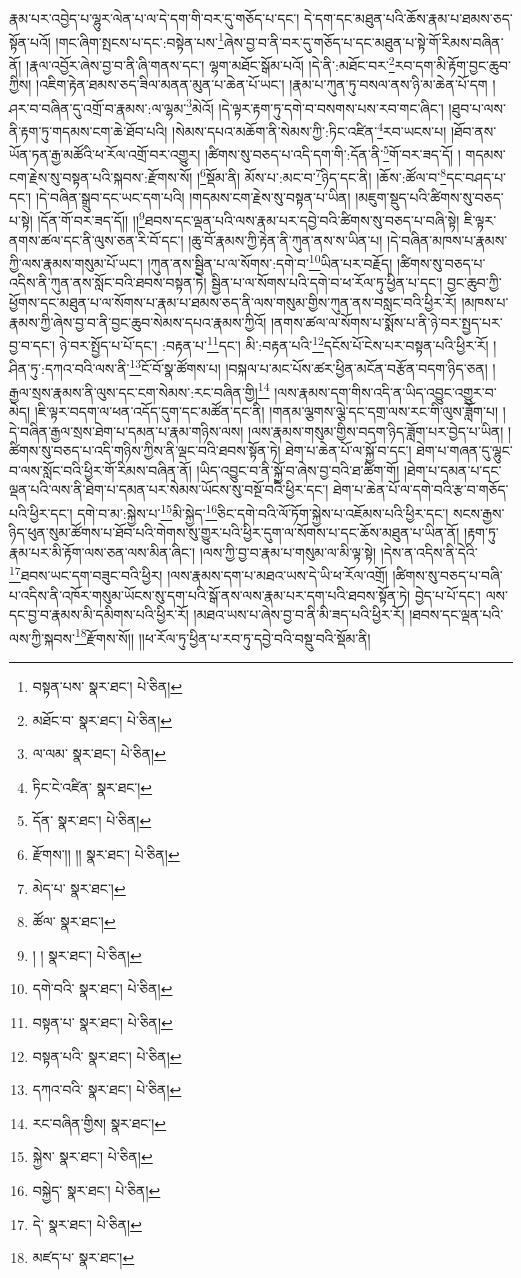 རྣམ་པར་འབྱེད་པ་ལྷུར་ལེན་པ་ལ་དེ་དག་གི་བར་དུ་གཅོད་པ་དང་། དེ་དག་དང་མཐུན་པའི་ཆོས་རྣམ་པ་ཐམས་ཅད་སྟོན་པའོ། །གང་ཞིག་སྤངས་པ་དང་:བསྟེན་པས་\footnote{བསྟན་པས་  སྣར་ཐང་།  པེ་ཅིན། }ཞེས་བྱ་བ་ནི་བར་དུ་གཅོད་པ་དང་མཐུན་པ་སྟེ་གོ་རིམས་བཞིན་ནོ། །རྣལ་འབྱོར་ཞེས་བྱ་བ་ནི་ཞི་གནས་དང་། ལྷག་མཐོང་སྒོམ་པའོ། །དེ་ནི་:མཐོང་བར་\footnote{མཐོང་བ་  སྣར་ཐང་།  པེ་ཅིན། }རབ་དག་མི་རྟོག་བྱང་ཆུབ་ཀྱིས། །འཇིག་རྟེན་ཐམས་ཅད་ཟིལ་མནན་མུན་པ་ཆེན་པོ་ཡང་། །རྣམ་པ་ཀུན་ཏུ་བསལ་ནས་ཉི་མ་ཆེན་པོ་དག །ཤར་བ་བཞིན་དུ་འགྲོ་བ་རྣམས་:ལ་ལྷམ་\footnote{ལ་ལམ་  སྣར་ཐང་།  པེ་ཅིན། }མེའོ། །དེ་ལྟར་རྟག་ཏུ་དགེ་བ་བསགས་པས་རབ་གང་ཞིང་། །ཐུབ་པ་ལས་ནི་རྟག་ཏུ་གདམས་ངག་ཆེ་ཐོབ་པའི། །སེམས་དཔའ་མཆོག་ནི་སེམས་ཀྱི་:ཏིང་འཛིན་\footnote{ཏིང་ངེ་འཛིན་  སྣར་ཐང་། }རབ་ཡངས་པ། །ཐོབ་ནས་ཡོན་ཏན་རྒྱ་མཚོའི་ཕ་རོལ་འགྲོ་བར་འགྱུར། །ཚིགས་སུ་བཅད་པ་འདི་དག་གི་:དོན་ནི་\footnote{དོན་  སྣར་ཐང་།  པེ་ཅིན། }གོ་བར་ཟད་དོ། །
གདམས་ངག་རྗེས་སུ་བསྟན་པའི་སྐབས་:རྫོགས་སོ། །\footnote{རྫོགས་།། །།  སྣར་ཐང་།  པེ་ཅིན། }སྡོམ་ནི། མོས་པ་:མང་བ་\footnote{མེད་པ་  སྣར་ཐང་། }ཉིད་དང་ནི། །ཆོས་:ཚོལ་བ་\footnote{ཚོལ་  སྣར་ཐང་། }དང་བཤད་པ་དང་། །དེ་བཞིན་སྒྲུབ་དང་ཡང་དག་པའི། །གདམས་ངག་རྗེས་སུ་བསྟན་པ་ཡིན། །མཇུག་སྡུད་པའི་ཚིགས་སུ་བཅད་པ་སྟེ། །དོན་གོ་བར་ཟད་དོ།། །།\footnote{། །  སྣར་ཐང་།  པེ་ཅིན། }ཐབས་དང་ལྡན་པའི་ལས་རྣམ་པར་དབྱེ་བའི་ཚིགས་སུ་བཅད་པ་བཞི་སྟེ། ཇི་ལྟར་ནགས་ཚལ་དང་ནི་ལུས་ཅན་རི་བོ་དང་། །ཆུ་བོ་རྣམས་ཀྱི་རྟེན་ནི་ཀུན་ནས་ས་ཡིན་པ། །དེ་བཞིན་མཁས་པ་རྣམས་ཀྱི་ལས་རྣམས་གསུམ་པོ་ཡང་། །ཀུན་ནས་སྦྱིན་པ་ལ་སོགས་:དགེ་བ་\footnote{དགེ་བའི་  སྣར་ཐང་།  པེ་ཅིན། }ཡིན་པར་བརྗོད། །ཚིགས་སུ་བཅད་པ་འདིས་ནི་ཀུན་ནས་སློང་བའི་ཐབས་བསྟན་ཏེ། སྦྱིན་པ་ལ་སོགས་པའི་དགེ་བ་ཕ་རོལ་ཏུ་ཕྱིན་པ་དང་། བྱང་ཆུབ་ཀྱི་ཕྱོགས་དང་མཐུན་པ་ལ་སོགས་པ་རྣམ་པ་ཐམས་ཅད་ནི་ལས་གསུམ་གྱིས་ཀུན་ནས་བསླང་བའི་ཕྱིར་རོ། །མཁས་པ་རྣམས་ཀྱི་ཞེས་བྱ་བ་ནི་བྱང་ཆུབ་སེམས་དཔའ་རྣམས་ཀྱིའོ། །ནགས་ཚལ་ལ་སོགས་པ་སྨོས་པ་ནི་ཉེ་བར་སྤྱད་པར་བྱ་བ་དང་། ཉེ་བར་སྤྱོད་པ་པོ་དང་། :བརྟན་པ་\footnote{བསྟན་པ་  སྣར་ཐང་།  པེ་ཅིན། }དང་། མི་:བརྟན་པའི་\footnote{བསྟན་པའི་  སྣར་ཐང་།  པེ་ཅིན། }དངོས་པོ་ངེས་པར་བསྟན་པའི་ཕྱིར་རོ། །ཤིན་ཏུ་:དཀའ་བའི་ལས་ནི་\footnote{དཀའ་བའི་  སྣར་ཐང་།  པེ་ཅིན། }ངོ་བོ་སྣ་ཚོགས་པ། །བསྐལ་པ་མང་པོས་ཚར་ཕྱིན་མངོན་བརྩོན་བདག་ཉིད་ཅན། །རྒྱལ་སྲས་རྣམས་ནི་ལུས་དང་ངག་སེམས་:རང་བཞིན་གྱི།\footnote{རང་བཞིན་གྱིས།  སྣར་ཐང་། } །ལས་རྣམས་དག་གིས་འདི་ན་ཡིད་འབྱུང་འགྱུར་བ་མེད། །ཇི་ལྟར་བདག་ལ་ཕན་འདོད་དུག་དང་མཚོན་དང་ནི། །གནམ་ལྕགས་ལྕེ་དང་དགྲ་ལས་རང་གི་ལུས་ཟློག་པ། །དེ་བཞིན་རྒྱལ་སྲས་ཐེག་པ་དམན་པ་རྣམ་གཉིས་ལས། །ལས་རྣམས་གསུམ་གྱིས་བདག་ཉིད་ཟློག་པར་བྱེད་པ་ཡིན། །ཚིགས་སུ་བཅད་པ་འདི་གཉིས་ཀྱིས་ནི་ལྡང་བའི་ཐབས་སྟོན་ཏེ། ཐེག་པ་ཆེན་པོ་ལ་སྐྱོ་བ་དང་། ཐེག་པ་གཞན་དུ་ལྷུང་བ་ལས་སློང་བའི་ཕྱིར་གོ་རིམས་བཞིན་ནོ། །ཡིད་འབྱུང་བ་ནི་སྐྱོ་བ་ཞེས་བྱ་བའི་ཐ་ཚིག་གོ། །ཐེག་པ་དམན་པ་དང་ལྡན་པའི་ལས་ནི་ཐེག་པ་དམན་པར་སེམས་ཡོངས་སུ་བསྔོ་བའི་ཕྱིར་དང་། ཐེག་པ་ཆེན་པོ་ལ་དགེ་བའི་རྩ་བ་གཅོད་པའི་ཕྱིར་དང་། དགེ་བ་མ་:སྐྱེས་པ་\footnote{སྐྱེས་  སྣར་ཐང་།  པེ་ཅིན། }མི་སྐྱེད་\footnote{བསྐྱེད་  སྣར་ཐང་།  པེ་ཅིན། }ཅིང་དགེ་བའི་ལོ་ཏོག་སྐྱེས་པ་འཇོམས་པའི་ཕྱིར་དང་། སངས་རྒྱས་ཉིད་ཕུན་སུམ་ཚོགས་པ་ཐོབ་པའི་གེགས་སུ་གྱུར་པའི་ཕྱིར་དུག་ལ་སོགས་པ་དང་ཆོས་མཐུན་པ་ཡིན་ནོ། །རྟག་ཏུ་རྣམ་པར་མི་རྟོག་ལས་ཅན་ལས་མིན་ཞིང་། །ལས་ཀྱི་བྱ་བ་རྣམ་པ་གསུམ་ལ་མི་ལྟ་སྟེ། །དེས་ན་འདིས་ནི་དེའི་\footnote{དེ་  སྣར་ཐང་།  པེ་ཅིན། }ཐབས་ཡང་དག་བཟུང་བའི་ཕྱིར། །ལས་རྣམས་དག་པ་མཐའ་ཡས་དེ་ཡི་ཕ་རོལ་འགྲོ། །ཚིགས་སུ་བཅད་པ་བཞི་པ་འདིས་ནི་འཁོར་གསུམ་ཡོངས་སུ་དག་པའི་སྒོ་ནས་ལས་རྣམ་པར་དག་པའི་ཐབས་སྟོན་ཏེ། བྱེད་པ་པོ་དང་། ལས་དང་བྱ་བ་རྣམས་མི་དམིགས་པའི་ཕྱིར་རོ། །མཐའ་ཡས་པ་ཞེས་བྱ་བ་ནི་མི་ཟད་པའི་ཕྱིར་རོ། །ཐབས་དང་ལྡན་པའི་ལས་ཀྱི་སྐབས་\footnote{མཛད་པ་  སྣར་ཐང་། }རྫོགས་སོ།། །།ཕ་རོལ་ཏུ་ཕྱིན་པ་རབ་ཏུ་དབྱེ་བའི་བསྡུ་བའི་སྡོམ་ནི། 